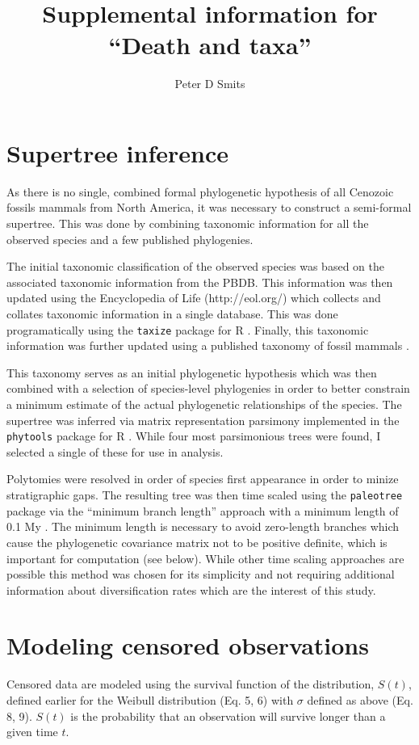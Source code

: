 \documentclass{article}
\title{Supplemental information for ``Death and taxa''}
\author{Peter D Smits}
\date{}
\begin{document}
\maketitle

\section{Supertree inference}
As there is no single, combined formal phylogenetic hypothesis of all Cenozoic fossils mammals from North America, it was necessary to construct a semi-formal supertree. This was done by combining taxonomic information for all the observed species and a few published phylogenies. 

The initial taxonomic classification of the observed species was based on the associated taxonomic information from the PBDB. This information was then updated using the Encyclopedia of Life (http://eol.org/) which collects and collates taxonomic information in a single database. This was done programatically using the \texttt{taxize} package for R \cite{2013taxize}. Finally, this taxonomic information was further updated using a published taxonomy of fossil mammals \cite{Janis2008,Janis1998}. 

This taxonomy serves as an initial phylogenetic hypothesis which was then combined with a selection of species-level phylogenies \cite{Bininda-Emonds2007,Raia2012f} in order to better constrain a minimum estimate of the actual phylogenetic relationships of the species. The supertree was inferred via matrix representation parsimony implemented in the \texttt{phytools} package for R \cite{revell2012phytools}. While four most parsimonious trees were found, I selected a single of these for use in analysis.

Polytomies were resolved in order of species first appearance in order to minize stratigraphic gaps. The resulting tree was then time scaled using the \texttt{paleotree} package via the ``minimum branch length'' approach with a minimum length of 0.1 My \cite{Bapst2012a}. The minimum length is necessary to avoid zero-length branches which cause the phylogenetic covariance matrix not to be positive definite, which is important for computation (see below). While other time scaling approaches are possible \cite{Bapst2013a,Hedman2010} this method was chosen for its simplicity and not requiring additional information about diversification rates which are the interest of this study.

\section{Modeling censored observations}
Censored data are modeled using the survival function of the distribution, \(S(t)\), defined earlier for the Weibull distribution (Eq. 5, 6) with \(\sigma\) defined as above (Eq. 8, 9). \(S(t)\) is the probability that an observation will survive longer than a given time \(t\). 
\end{document}
